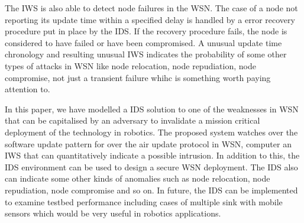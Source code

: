 \documentclass[conference,manuscript]{IEEEtran}
\newcommand{\notedme}[1]{\raisebox{0pt}[0pt][0pt]{\pdfcomment[open=true,color=blue]{#1}}}
\begin{document}
The IWS is also able to detect node failures in the WSN.
The case of a node not reporting its update time within a specified delay is handled by a error recovery procedure put in place by the IDS.
If the recovery procedure fails, the node is considered to have failed or have been compromised.
A unusual update time chronology and resulting unusual IWS  indicates the probability of some other types of attacks in WSN like node relocation, node repudiation, node compromise, not just a transient failure whihc is something worth paying attention to.


In this paper, we have modelled a IDS solution to one of the weaknesses in WSN that can be capitalised by an adversary to invalidate a mission critical deployment of the technology in robotics. 
The proposed system watches over the software update pattern for over the air update protocol in WSN, computer an IWS that can quantitatively indicate a possible intrusion.
In addition to this, the IDS environment can be used to design a secure WSN deployment.
The IDS also can indicate some other kinds of anomalies such as node relocation, node repudiation, node compromise and so on.
In future,  the IDS can be implemented to examine testbed performance including cases of multiple sink with mobile sensors which would be very useful in robotics applications.
\end{document}
